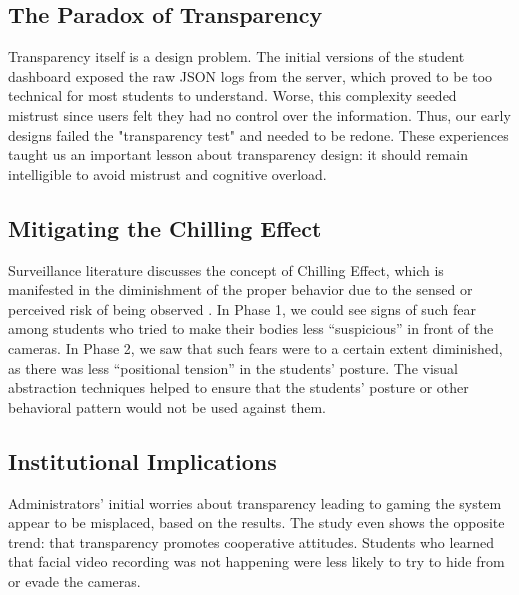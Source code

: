 \documentclass[conference]{IEEEtran}
\begin{document}
\subsection{The Paradox of Transparency}
Transparency itself is a design problem. The initial versions of the student dashboard exposed the raw JSON logs from the server, which proved to be too technical for most students to understand. Worse, this complexity seeded mistrust since users felt they had no control over the information. Thus, our early designs failed the "transparency test" and needed to be redone. These experiences taught us an important lesson about transparency design: it should remain intelligible to avoid mistrust and cognitive overload.

\subsection{Mitigating the Chilling Effect}
Surveillance literature discusses the concept of Chilling Effect, which is manifested in the diminishment of the proper behavior due to the sensed or perceived risk of being observed \cite{b7}. In Phase 1, we could see signs of such fear among students who tried to make their bodies less “suspicious” in front of the cameras. In Phase 2, we saw that such fears were to a certain extent diminished, as there was less “positional tension” in the students’ posture. The visual abstraction techniques helped to ensure that the students’ posture or other behavioral pattern would not be used against them.

\subsection{Institutional Implications}
Administrators' initial worries about transparency leading to gaming the system appear to be misplaced, based on the results. The study even shows the opposite trend: that transparency promotes cooperative attitudes. Students who learned that facial video recording was not happening were less likely to try to hide from or evade the cameras.
\end{document}
